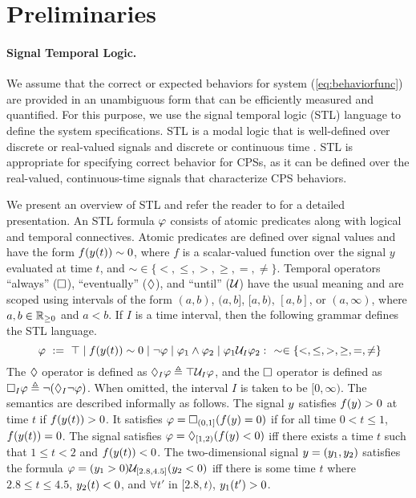 \section{Preliminaries} \label{sec:prlim}
\paragraph{Signal Temporal Logic.} 

We assume that the correct or expected behaviors for system (\ref{eq:behaviorfunc}) are provided in an unambiguous form that can be efficiently measured and quantified. For this purpose, we use the signal temporal logic (STL) language to define the system specifications.
STL is a modal logic that is well-defined over discrete or real-valued signals and discrete or continuous time \cite{MalerN04}.
STL is appropriate for specifying correct behavior for CPSs, as it can be defined over the real-valued, continuous-time signals that characterize CPS behaviors. 

We present an overview of STL and refer the reader to \cite{MalerN04} for a detailed presentation.
An STL formula $\varphi$ consists of atomic predicates along with logical and temporal connectives.
Atomic predicates are defined over signal values and have the form $ f(y(t))\sim 0$, where $f$ is a scalar-valued function over the signal $y$ evaluated at time $t$, and $\sim \in \{ <,\leq, >, \geq, =, \neq \}$.
Temporal operators ``always'' ($\Box$), ``eventually'' ($\Diamond$), and ``until'' ($\mathcal{U}$) have the usual meaning and are scoped using intervals of the form $(a,b)$, $(a,b]$, $[a,b)$, $[a,b]$, or $(a,\infty)$, where 
$a,b\in \mathbb{R}_{\geq 0}$ and $a<b$. If $I$ is a time interval, then the following grammar defines the STL language.
\begin{equation}~\label{eqn:stl-gen}
\varphi ~ := ~ \top \; | \; f(y(t))\sim 0 \; | \; \neg \varphi \; | \;
\varphi_1 \wedge \varphi_2 \; | \; \varphi_1 \mathcal{U}_I \varphi_2:~~\sim \in \{ <,\leq,>,\geq,=,\neq \}
\end{equation}
The $\Diamond$ operator is defined as $\Diamond_I \varphi \triangleq \top \mathcal{U}_I \varphi$, and the $\Box$ operator is defined as $\Box_I \varphi \triangleq \neg (\Diamond _I \neg \varphi)$. When omitted, the interval $I$ is taken  to be $[0,\infty)$. The semantics are described informally as follows. The signal $y$ satisfies $f(y)> 0$ at time $t$ if $f(y(t))>0$. It satisfies $\varphi = \Box_{(0,1]}(f(y)=0)$ if for all time $0< t \leq 1$, $f(y(t))=0$. The signal satisfies $\varphi= \Diamond_{[1,2)}(f(y)<0)$ iff there exists a time $t$ such that $1\leq t < 2$ and $f(y(t))<0$. The two-dimensional signal $y=(y_1,y_2)$ satisfies the formula $\varphi=(y_1>0)\mathcal{U}_{[2.8,4.5]}(y_2<0)$ iff there is some time $t$ where $2.8 \leq t \leq 4.5$, $y_2(t)<0$, and $\forall t'$ in $[2.8,t)$, $y_1(t')>0$. 


